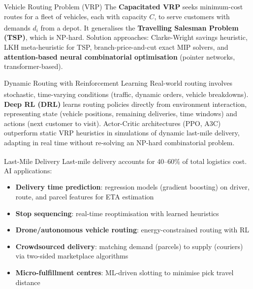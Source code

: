 \begin{v3topic}{Vehicle Routing Problem (VRP)}
    The \textbf{Capacitated VRP} seeks minimum-cost routes for a fleet of vehicles, each with capacity $C$, to serve customers with demands $d_i$ from a depot\textsuperscript{\cite[][pp.~420--440]{hillierIntroductionOperationsResearch2020}}.
    It generalises the \textbf{Travelling Salesman Problem (TSP)}, which is NP-hard.
    Solution approaches: Clarke-Wright savings heuristic, LKH meta-heuristic for TSP, branch-price-and-cut exact MIP solvers, and \textbf{attention-based neural combinatorial optimisation} (pointer networks, transformer-based).

\end{v3topic}
\begin{v3topic}{Dynamic Routing with Reinforcement Learning}
    Real-world routing involves stochastic, time-varying conditions (traffic, dynamic orders, vehicle breakdowns)\textsuperscript{\cite[][pp.~1--3]{panJobShopSchedulingRL2021}}.
    \textbf{Deep RL (DRL)} learns routing policies directly from environment interaction, representing state (vehicle positions, remaining deliveries, time windows) and actions (next customer to visit).
    Actor-Critic architectures (PPO, A3C) outperform static VRP heuristics in simulations of dynamic last-mile delivery, adapting in real time without re-solving an NP-hard combinatorial problem.

\end{v3topic}
\begin{v3topic}{Last-Mile Delivery}
    Last-mile delivery accounts for 40--60\% of total logistics cost\textsuperscript{\cite[][pp.~444--448]{chopraSupplyChainManagement2019}}.
    AI applications:
    \begin{itemize}
        \item \textbf{Delivery time prediction}: regression models (gradient boosting) on driver, route, and parcel features for ETA estimation
        \item \textbf{Stop sequencing}: real-time reoptimisation with learned heuristics
        \item \textbf{Drone/autonomous vehicle routing}: energy-constrained routing with RL
        \item \textbf{Crowdsourced delivery}: matching demand (parcels) to supply (couriers) via two-sided marketplace algorithms
        \item \textbf{Micro-fulfillment centres}: ML-driven slotting to minimise pick travel distance
    \end{itemize}

\end{v3topic}


